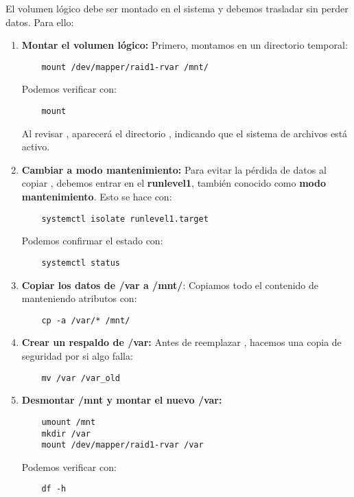 El volumen lógico  debe ser montado en el sistema y debemos trasladar  sin perder datos. Para ello:

\begin{enumerate}
    \item \textbf{Montar el volumen lógico:}  
    Primero, montamos  en un directorio temporal:
    \begin{verbatim}
    mount /dev/mapper/raid1-rvar /mnt/
    \end{verbatim}
    Podemos verificar con:
    \begin{verbatim}
    mount
    \end{verbatim}
    Al revisar , aparecerá el directorio , indicando que el sistema de archivos está activo.

    \item \textbf{Cambiar a modo mantenimiento:}  
    Para evitar la pérdida de datos al copiar , debemos entrar en el \textbf{runlevel1}, también conocido como \textbf{modo mantenimiento}. Esto se hace con:
    \begin{verbatim}
    systemctl isolate runlevel1.target
    \end{verbatim}
    Podemos confirmar el estado con:
    \begin{verbatim}
    systemctl status
    \end{verbatim}

    \item \textbf{Copiar los datos de /var a /mnt/}:  
    Copiamos todo el contenido de  manteniendo atributos con:
    \begin{verbatim}
    cp -a /var/* /mnt/
    \end{verbatim}

    \item \textbf{Crear un respaldo de /var:}  
    Antes de reemplazar , hacemos una copia de seguridad por si algo falla:
    \begin{verbatim}
    mv /var /var_old
    \end{verbatim}

    \item \textbf{Desmontar /mnt y montar el nuevo /var:}  
    \begin{verbatim}
    umount /mnt
    mkdir /var
    mount /dev/mapper/raid1-rvar /var
    \end{verbatim}
    Podemos verificar con:
    \begin{verbatim}
    df -h
    \end{verbatim}


\end{enumerate}
